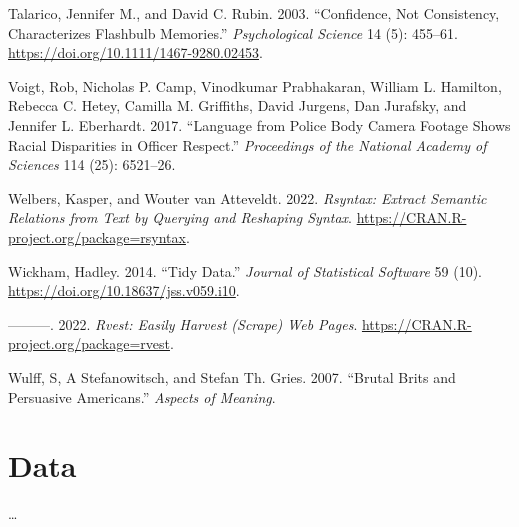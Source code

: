 \documentclass[
  letterpaper,
]{latex/krantz}
\newlength{\cslhangindent}
\newlength{\cslentryspacingunit} %
\newenvironment{CSLReferences}[2] %
 {%
  \setlength{\parindent}{0pt}
  \ifodd #1
  \let\oldpar\par
  \def\par{\hangindent=\cslhangindent\oldpar}
  \fi
  \setlength{\parskip}{#2\cslentryspacingunit}
 }%
 {}
\begin{document}
\begin{CSLReferences}{1}{0}
\leavevmode{}%
Talarico, Jennifer M., and David C. Rubin. 2003. {``Confidence, Not
Consistency, Characterizes Flashbulb Memories.''} \emph{Psychological
Science} 14 (5): 455--61. \url{https://doi.org/10.1111/1467-9280.02453}.

\leavevmode{}%
Voigt, Rob, Nicholas P. Camp, Vinodkumar Prabhakaran, William L.
Hamilton, Rebecca C. Hetey, Camilla M. Griffiths, David Jurgens, Dan
Jurafsky, and Jennifer L. Eberhardt. 2017. {``Language from Police Body
Camera Footage Shows Racial Disparities in Officer Respect.''}
\emph{Proceedings of the National Academy of Sciences} 114 (25):
6521--26.

\leavevmode{}%
Welbers, Kasper, and Wouter van Atteveldt. 2022. \emph{Rsyntax: Extract
Semantic Relations from Text by Querying and Reshaping Syntax}.
\url{https://CRAN.R-project.org/package=rsyntax}.

\leavevmode{}%
Wickham, Hadley. 2014. {``Tidy Data.''} \emph{Journal of Statistical
Software} 59 (10). \url{https://doi.org/10.18637/jss.v059.i10}.

\leavevmode{}%
---------. 2022. \emph{Rvest: Easily Harvest (Scrape) Web Pages}.
\url{https://CRAN.R-project.org/package=rvest}.

\leavevmode{}%
Wulff, S, A Stefanowitsch, and Stefan Th. Gries. 2007. {``Brutal Brits
and Persuasive Americans.''} \emph{Aspects of Meaning}.

\end{CSLReferences}

\appendix
{}

\hypertarget{data-appendix}{%
\chapter{Data}\label{data-appendix}}

\ldots{}



\printindex
\end{document}
